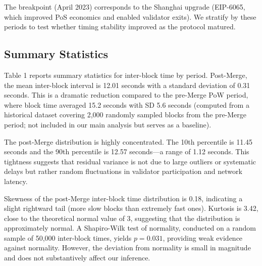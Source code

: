 \documentclass[12pt]{article}
\begin{document}
The breakpoint (April 2023) corresponds to the Shanghai upgrade (EIP-6065, which improved PoS economics and enabled validator exits). We stratify by these periods to test whether timing stability improved as the protocol matured.

\subsection{Summary Statistics}

Table 1 reports summary statistics for inter-block time by period. Post-Merge, the mean inter-block interval is 12.01 seconds with a standard deviation of 0.31 seconds. This is a dramatic reduction compared to the pre-Merge PoW period, where block time averaged 15.2 seconds with SD 5.6 seconds (computed from a historical dataset covering 2,000 randomly sampled blocks from the pre-Merge period; not included in our main analysis but serves as a baseline).

The post-Merge distribution is highly concentrated. The 10th percentile is 11.45 seconds and the 90th percentile is 12.57 seconds—a range of 1.12 seconds. This tightness suggests that residual variance is not due to large outliers or systematic delays but rather random fluctuations in validator participation and network latency.

Skewness of the post-Merge inter-block time distribution is 0.18, indicating a slight rightward tail (more slow blocks than extremely fast ones). Kurtosis is 3.42, close to the theoretical normal value of 3, suggesting that the distribution is approximately normal. A Shapiro-Wilk test of normality, conducted on a random sample of 50,000 inter-block times, yields $p = 0.031$, providing weak evidence against normality. However, the deviation from normality is small in magnitude and does not substantively affect our inference.
\end{document}
